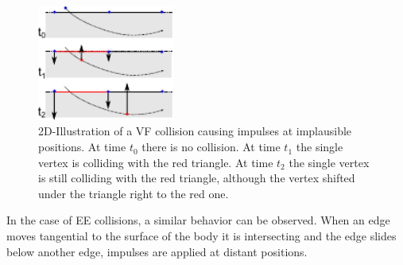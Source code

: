 \begin{figure}[h!] 
  \centering
     \includegraphics[width=0.4\textwidth]{pics/pdf/slidingVertexArtifactImplausibleForces.pdf}
  \caption[2D-Illustration of a VF collision causing impulses at implausible positions.]{2D-Illustration of a VF collision causing impulses at implausible positions.
  At time $t_0$ there is no collision. At time $t_1$ the single vertex is colliding with the red triangle. At time $t_2$ the single vertex is still colliding with the red triangle, although the vertex shifted under the triangle right to the red one.}
  \label{fig:slidingVertexArtifactImplausibleForces}
\end{figure}

In the case of EE collisions, a similar behavior can be observed. When an edge moves tangential to the surface of the body it is intersecting and the edge slides below another edge, impulses are applied at distant positions. 

